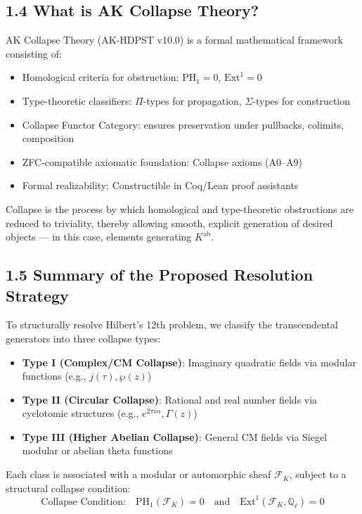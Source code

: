 \documentclass[11pt]{article}
\begin{document}
\subsection{1.4 What is AK Collapse Theory?}

AK Collapse Theory (AK-HDPST v10.0) is a formal mathematical framework consisting of:
\begin{itemize}
    \item Homological criteria for obstruction: \( \mathrm{PH}_1 = 0 \), \( \mathrm{Ext}^1 = 0 \)
    \item Type-theoretic classifiers: \( \Pi \)-types for propagation, \( \Sigma \)-types for construction
    \item Collapse Functor Category: ensures preservation under pullbacks, colimits, composition
    \item ZFC-compatible axiomatic foundation: Collapse axioms (A0–A9)
    \item Formal realizability: Constructible in Coq/Lean proof assistants
\end{itemize}

Collapse is the process by which homological and type-theoretic obstructions are reduced to triviality, thereby allowing smooth, explicit generation of desired objects — in this case, elements generating \( K^{\mathrm{ab}} \).

\subsection{1.5 Summary of the Proposed Resolution Strategy}

To structurally resolve Hilbert's 12th problem, we classify the transcendental generators into three collapse types:

\begin{itemize}
    \item \textbf{Type I (Complex/CM Collapse)}: Imaginary quadratic fields via modular functions (e.g., \( j(\tau), \wp(z) \))
    \item \textbf{Type II (Circular Collapse)}: Rational and real number fields via cyclotomic structures (e.g., \( e^{2\pi i \alpha}, \Gamma(z) \))
    \item \textbf{Type III (Higher Abelian Collapse)}: General CM fields via Siegel modular or abelian theta functions
\end{itemize}

Each class is associated with a modular or automorphic sheaf \( \mathcal{F}_K \), subject to a structural collapse condition:
\[
\text{Collapse Condition:} \quad \mathrm{PH}_1(\mathcal{F}_K) = 0 \quad \text{and} \quad \mathrm{Ext}^1(\mathcal{F}_K, \mathbb{Q}_\ell) = 0
\]
\end{document}
